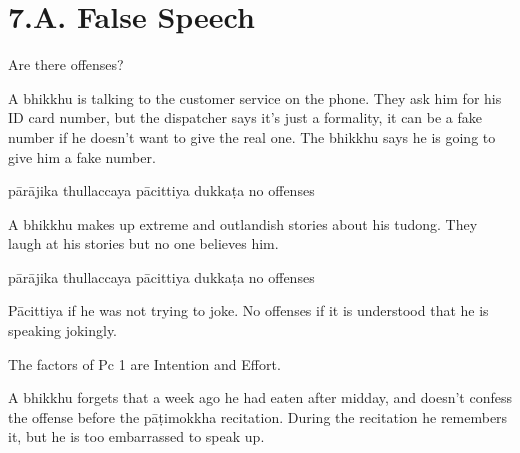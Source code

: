 \chapter{7.A. False Speech}
\renewcommand*{\theChapterTitle}{7.A. False Speech}

\begin{exam}{\autoExamName}

\begin{problem*}

Are there offenses?

\begin{parts}

\item A bhikkhu is talking to the customer service on the phone. They ask him for
  his ID card number, but the dispatcher says it's just a formality, it can be a
  fake number if he doesn't want to give the real one. The bhikkhu says he is
  going to give him a fake number.

  \bigskip

  \begin{answers}{5}
    \bChoices
     pārājika\eAns
     thullaccaya\eAns
     pācittiya\eAns
     dukkaṭa\eAns
     no offenses\eAns
    \eChoices
  \end{answers}

  \bigskip

\item A bhikkhu makes up extreme and outlandish stories about his tudong. They
  laugh at his stories but no one believes him.

  \bigskip

  \begin{answers}{5}
    \bChoices
     pārājika\eAns
     thullaccaya\eAns
     pācittiya\eAns
     dukkaṭa\eAns
     no offenses\eAns
    \eChoices
  \end{answers}

  \begin{solution}
    Pācittiya if he was not trying to joke.
    No offenses if it is understood that he is speaking jokingly.

    The factors of Pc 1 are Intention and Effort.
  \end{solution}

  \bigskip

\item A bhikkhu forgets that a week ago he had eaten after midday, and doesn't
  confess the offense before the pāṭimokkha recitation. During the recitation he
  remembers it, but he is too embarrassed to speak up.


\end{parts}
\end{problem*}
\end{exam}
